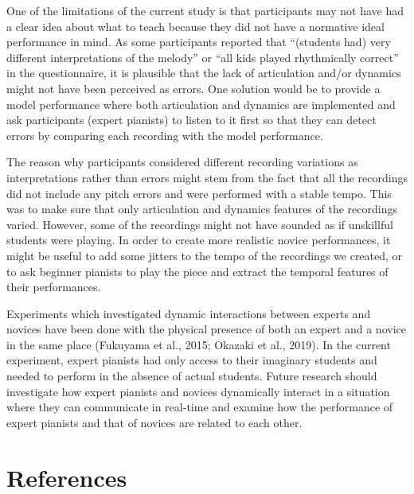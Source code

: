 \documentclass[
  man,floatsintext]{apa6}
\begin{document}
One of the limitations of the current study is that participants may not have had a clear idea about what to teach because they did not have a normative ideal performance in mind. As some participants reported that ``(students had) very different interpretations of the melody'' or ``all kids played rhythmically correct'' in the questionnaire, it is plausible that the lack of articulation and/or dynamics might not have been perceived as errors. One solution would be to provide a model performance where both articulation and dynamics are implemented and ask participants (expert pianists) to listen to it first so that they can detect errors by comparing each recording with the model performance.

The reason why participants considered different recording variations as interpretations rather than errors might stem from the fact that all the recordings did not include any pitch errors and were performed with a stable tempo. This was to make sure that only articulation and dynamics features of the recordings varied. However, some of the recordings might not have sounded as if unskillful students were playing. In order to create more realistic novice performances, it might be useful to add some jitters to the tempo of the recordings we created, or to ask beginner pianists to play the piece and extract the temporal features of their performances.

Experiments which investigated dynamic interactions between experts and novices have been done with the physical presence of both an expert and a novice in the same place (Fukuyama et al., 2015; Okazaki et al., 2019). In the current experiment, expert pianists had only access to their imaginary students and needed to perform in the absence of actual students. Future research should investigate how expert pianists and novices dynamically interact in a situation where they can communicate in real-time and examine how the performance of expert pianists and that of novices are related to each other.

\clearpage

\hypertarget{references}{%
\section{References}\label{references}}

\begingroup
\setlength{\parindent}{-0in}
\setlength{\leftskip}{0in}
\end{document}
